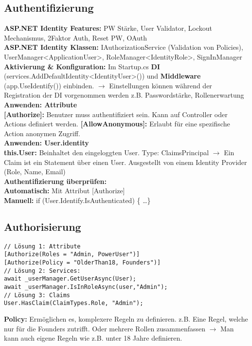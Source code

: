 \subsection{Authentifizierung}
\textcolor{b}{\textbf{ASP.NET Identity Features:}} PW Stärke, User Validator, Lockout Mechanismus, 2Faktor Auth, Reset PW, OAuth\\
\textcolor{b}{\textbf{ASP.NET Identity Klassen:}} IAuthorizationService (Validation von Policies), UserManager<ApplicationUser>, RoleManager<IdentityRole>, SignInManager\\
\textcolor{b}{\textbf{Aktivierung \& Konfiguration:}} Im Startup.cs \textbf{DI} (services.AddDefaultIdentity<IdentityUser>()) und \textbf{Middleware} (app.UseIdentify()) einbinden. $\rightarrow$ Einstellungen können während der Registration der DI vorgenommen werden z.B. Passwordstärke, Rollenerwartung\\
\textcolor{b}{\textbf{Anwenden: Attribute}}\\
\textbf{[Authorize]:} Benutzer muss authentifiziert sein. Kann auf Controller oder Actions definiert werden. \textbf{[AllowAnonymous]:} Erlaubt für eine spezifische Action anonymen Zugriff.\\
\textcolor{b}{\textbf{Anwenden: User.identity}}\\
\textbf{this.User:} Beinhaltet den eingeloggten User. Type: ClaimsPrincipal $\rightarrow$ Ein Claim ist ein Statement über einen User. Ausgestellt von einem Identity Provider (Role, Name, Email)\\
\textcolor{b}{\textbf{Authentifizierung überprüfen:}}\\
\textbf{Automatisch:} Mit Attribut [Authorize]\\
\textbf{Manuell:} if (User.Identify.IsAuthenticated) \{ \ldots \}
\subsection{Authorisierung}
\begin{lstlisting}[style=csh]
// Lösung 1: Attribute
[Authorize(Roles = "Admin, PowerUser")]
[Authorize(Policy = "OlderThan18, Founders")]
// Lösung 2: Services:
await _userManager.GetUserAsync(User);
await _userManager.IsInRoleAsync(user,"Admin");
// Lösung 3: Claims
User.HasClaim(ClaimTypes.Role, "Admin");
\end{lstlisting}
\textcolor{b}{\textbf{Policy:}} Ermöglichen es, komplexere Regeln zu definieren. z.B. Eine Regel, welche nur für die Founders zutrifft. Oder mehrere Rollen zusammenfassen $\rightarrow$ Man kann auch eigene Regeln wie z.B. unter 18 Jahre definieren.
